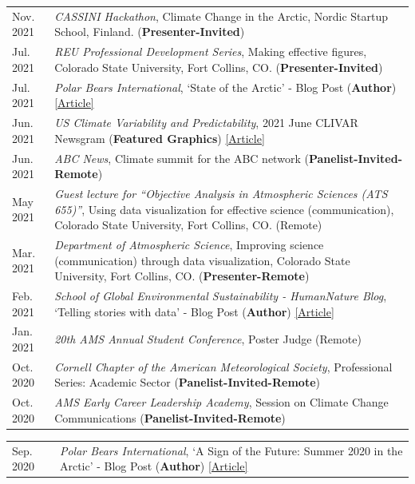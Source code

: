 \documentclass[margin,line,palatino,courier,10pt]{res}
\begin{document}
\begin{resume}
\begin{tabular}{@{}p{0.9in}p{4in}}
Nov. 2021 & \textit{CASSINI Hackathon}, Climate Change in the Arctic, Nordic Startup School, Finland. (\textbf{Presenter-Invited})\\
Jul. 2021 & \textit{REU Professional Development Series}, Making effective figures, Colorado State University, Fort Collins, CO. (\textbf{Presenter-Invited})\\
Jul. 2021 & \textit{Polar Bears International}, `State of the Arctic' - Blog Post (\textbf{Author}) \href{https://polarbearsinternational.org/news/article-climate-change/state-of-the-arctic/}{[Article]}\\
Jun. 2021 & \textit{US Climate Variability and Predictability}, 2021 June CLIVAR Newsgram (\textbf{Featured Graphics}) \href{https://mailchi.mp/usclivar/newsgram-2021june}{[Article]}\\
Jun. 2021 & \textit{ABC News}, Climate summit for the ABC network (\textbf{Panelist-Invited-Remote})\\
May 2021 & \textit{Guest lecture for ``Objective Analysis in Atmospheric Sciences (ATS 655)''}, Using data visualization for effective science (communication), Colorado State University, Fort Collins, CO. (Remote)\\
Mar. 2021 & \textit{Department of Atmospheric Science}, Improving science (communication) through data visualization, Colorado State University, Fort Collins, CO. (\textbf{Presenter-Remote})\\
Feb. 2021 & \textit{School of Global Environmental Sustainability - HumanNature Blog}, `Telling stories with data' - Blog Post (\textbf{Author}) \href{https://sustainability.colostate.edu/blog/humannature/zachary-labe/}{[Article]}\\
Jan. 2021 & \textit{20th AMS Annual Student Conference}, Poster Judge (Remote)\\
Oct. 2020 & \textit{Cornell Chapter of the American Meteorological Society}, Professional Series: Academic Sector (\textbf{Panelist-Invited-Remote})\\
Oct. 2020 & \textit{AMS Early Career Leadership Academy}, Session on Climate Change Communications (\textbf{Panelist-Invited-Remote})\\
\end{tabular}
\begin{tabular}{@{}p{0.9in}p{4in}}
Sep. 2020 & \textit{Polar Bears International}, `A Sign of the Future: Summer 2020 in the Arctic' - Blog Post (\textbf{Author}) \href{https://polarbearsinternational.org/news/article-climate-change/a-sign-of-the-future-summer-2020-in-the-arctic/}{[Article]}\\

\end{tabular}
\end{resume}
\end{document}
